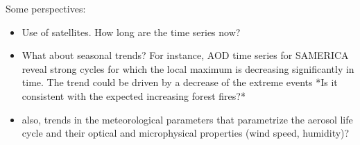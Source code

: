 \documentclass[journal abbreviation, manuscript]{copernicus}
\begin{document}
Some perspectives:
\begin{itemize}
 \item  Use of satellites. How long are the time series now?
 \item What about seasonal trends? For instance, AOD time series for SAMERICA reveal strong cycles for which the local maximum is decreasing significantly in time. The trend could be driven by a decrease of the extreme events *Is it consistent with the expected increasing forest fires?*
 \item also, trends in the meteorological parameters that parametrize the aerosol life cycle and their optical and microphysical properties (wind speed, humidity)?
\end{itemize}













\appendix
\section{} %

\subsection{}     %


\noappendix       %

\end{document}
